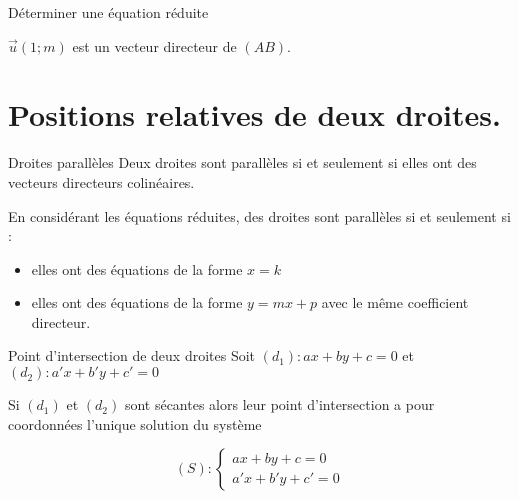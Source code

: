 \begin{pageCours}
\begin{PpT}{Déterminer une équation réduite}
\begin{itemize}
$\vec{u}(1;m)$ est un vecteur directeur de $(AB)$.
\end{itemize}
\end{PpT}

\section{Positions relatives de deux droites.}

\begin{PpT}{Droites parallèles}
Deux droites sont parallèles si et seulement si elles ont des vecteurs directeurs colinéaires.
\end{PpT}

\begin{Rq}
En considérant les équations réduites, des droites sont parallèles si et seulement si :
\begin{itemize}
\item elles ont des équations de la forme $x=k$
\item elles ont des équations de la forme $y=mx+p$
avec le même coefficient directeur.
\end{itemize}
\end{Rq}

\begin{PpT}{Point d'intersection de deux droites}
Soit $(d_1):ax+by+c=0$ et $(d_2):a'x+b'y+c'=0$

Si $(d_1)$ et $(d_2)$ sont sécantes alors leur point d'intersection a pour coordonnées l'unique solution du système 

\[(S):
\begin{cases} 
ax+by+c=0 \\ 
a'x+b'y+c'=0
\end{cases}
\]
\end{PpT}


\end{pageCours} %

